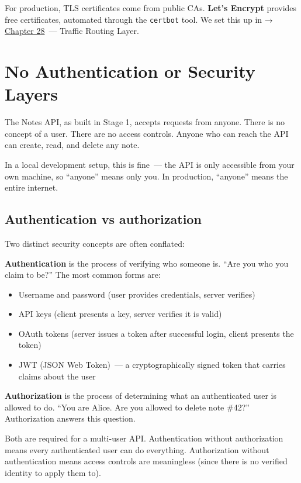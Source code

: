 \noindent{}For production, TLS certificates come from public CAs. \textbf{Let's Encrypt} provides free certificates, automated through the \texttt{certbot} tool. We set this up in → \hyperref[ch:28-traffic-routing]{Chapter 28}~--- Traffic Routing Layer.

\setcounter{section}{3}
\section{No Authentication or Security Layers}\label{11-reliability-security-gaps:114-no-authentication-or-security-layers}

The Notes API, as built in Stage 1, accepts requests from anyone. There is no concept of a user. There are no access controls. Anyone who can reach the API can create, read, and delete any note.

In a local development setup, this is fine~--- the API is only accessible from your own machine, so ``anyone'' means only you. In production, ``anyone'' means the entire internet.

\subsection*{Authentication vs authorization}\label{11-reliability-security-gaps:authentication-vs-authorization}

Two distinct security concepts are often conflated:

\textbf{Authentication} is the process of verifying who someone is. ``Are you who you claim to be?'' The most common forms are:

\begin{itemize}
\tightlist
\item
  Username and password (user provides credentials, server verifies)
\item
  API keys (client presents a key, server verifies it is valid)
\item
  OAuth tokens (server issues a token after successful login, client presents the token)
\item
  JWT (JSON Web Token)~--- a cryptographically signed token that carries claims about the user
\end{itemize}

\noindent{}\textbf{Authorization} is the process of determining what an authenticated user is allowed to do. ``You are Alice. Are you allowed to delete note \#42?'' Authorization answers this question.

Both are required for a multi-user API. Authentication without authorization means every authenticated user can do everything. Authorization without authentication means access controls are meaningless (since there is no verified identity to apply them to).


